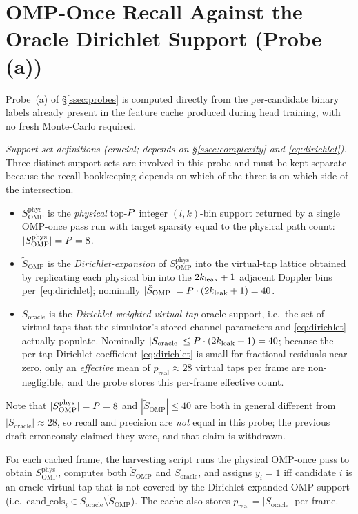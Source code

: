 \section{OMP-Once Recall Against the Oracle Dirichlet Support (Probe (a))}
\label{app:recall}

Probe~(a) of \S\ref{ssec:probes} is computed directly from the per-candidate binary labels already present in the feature cache produced during head training, with no fresh Monte-Carlo required.

\emph{Support-set definitions (crucial; depends on \S\ref{ssec:complexity} and \eqref{eq:dirichlet}).}
Three distinct support sets are involved in this probe and must be kept separate because the recall bookkeeping depends on which of the three is on which side of the intersection.
\begin{itemize}[leftmargin=*,itemsep=0pt,topsep=1pt]
\item $S_{\text{OMP}}^{\text{phys}}$ is the \emph{physical} top-$P$ integer $(l, k)$-bin support returned by a single OMP-once pass run with target sparsity equal to the physical path count: $|S_{\text{OMP}}^{\text{phys}}| = P = 8$.
\item $\tilde{S}_{\text{OMP}}$ is the \emph{Dirichlet-expansion} of $S_{\text{OMP}}^{\text{phys}}$ into the virtual-tap lattice obtained by replicating each physical bin into the $2k_{\mathrm{leak}} + 1$ adjacent Doppler bins per~\eqref{eq:dirichlet}; nominally $|\tilde{S}_{\text{OMP}}| = P \cdot (2k_{\mathrm{leak}} + 1) = 40$.
\item $S_{\text{oracle}}$ is the \emph{Dirichlet-weighted virtual-tap} oracle support, i.e.\ the set of virtual taps that the simulator's stored channel parameters and \eqref{eq:dirichlet} actually populate. Nominally $|S_{\text{oracle}}| \leq P \cdot (2k_{\mathrm{leak}} + 1) = 40$; because the per-tap Dirichlet coefficient \eqref{eq:dirichlet} is small for fractional residuals near zero, only an \emph{effective} mean of $p_{\text{real}} \approx 28$ virtual taps per frame are non-negligible, and the probe stores this per-frame effective count.
\end{itemize}
Note that $|S_{\text{OMP}}^{\text{phys}}| = P = 8$ and $|\tilde{S}_{\text{OMP}}| \leq 40$ are both in general different from $|S_{\text{oracle}}| \approx 28$, so recall and precision are \emph{not} equal in this probe; the previous draft erroneously claimed they were, and that claim is withdrawn.

For each cached frame, the harvesting script runs the physical OMP-once pass to obtain $S_{\text{OMP}}^{\text{phys}}$, computes both $\tilde{S}_{\text{OMP}}$ and $S_{\text{oracle}}$, and assigns $y_i = 1$ iff candidate $i$ is an oracle virtual tap that is not covered by the Dirichlet-expanded OMP support (i.e.\ $\text{cand\_cols}_i \in S_{\text{oracle}} \setminus \tilde{S}_{\text{OMP}}$). The cache also stores $p_{\text{real}} = |S_{\text{oracle}}|$ per frame.

